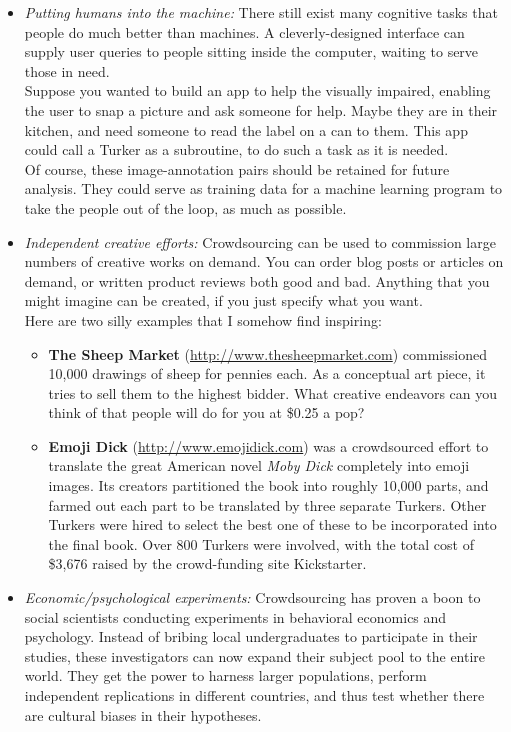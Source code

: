 \documentclass[10pt]{article}
\begin{document}
\begin{itemize}
    \item \textit{Putting humans into the machine:} There still exist many cognitive tasks that people do much better than machines. A cleverly-designed interface can supply user queries to people sitting inside the computer, waiting to serve those in need.\\
          Suppose you wanted to build an app to help the visually impaired, enabling the user to snap a picture and ask someone for help. Maybe they are in their kitchen, and need someone to read the label on a can to them. This app could call a Turker as a subroutine, to do such a task as it is needed.\\
          Of course, these image-annotation pairs should be retained for future analysis. They could serve as training data for a machine learning program to take the people out of the loop, as much as possible.
    \item \textit{Independent creative efforts:} Crowdsourcing can be used to commission large numbers of creative works on demand. You can order blog posts or articles on demand, or written product reviews both good and bad. Anything that you might imagine can be created, if you just specify what you want.\\
          Here are two silly examples that I somehow find inspiring:
          \begin{itemize}
              \item \textbf{The Sheep Market} (\url{http://www.thesheepmarket.com}) commissioned 10,000 drawings of sheep for pennies each. As a conceptual art piece, it tries to sell them to the highest bidder. What creative endeavors can you think of that people will do for you at \$0.25 a pop?
              \item \textbf{Emoji Dick} (\url{http://www.emojidick.com}) was a crowdsourced effort to translate the great American novel \textit{Moby Dick} completely into emoji images. Its creators partitioned the book into roughly 10,000 parts, and farmed out each part to be translated by three separate Turkers. Other Turkers were hired to select the best one of these to be incorporated into the final book. Over 800 Turkers were involved, with the total cost of \$3,676 raised by the crowd-funding site Kickstarter.
          \end{itemize}
    \item \textit{Economic/psychological experiments:} Crowdsourcing has proven a boon to social scientists conducting experiments in behavioral economics and psychology. Instead of bribing local undergraduates to participate in their studies, these investigators can now expand their subject pool to the entire world. They get the power to harness larger populations, perform independent replications in different countries, and thus test whether there are cultural biases in their hypotheses.
\end{itemize}
\end{document}
